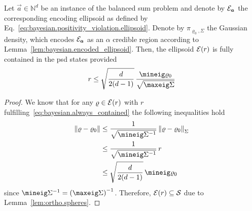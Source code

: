 \begin{lemma}\label{lem:bayesian.always_contained}
  Let $\vec a \in \mathbb{N}^d$ be an instance of the balanced sum problem and denote by $\mathcal{E}_{{\boldsymbol{a}}}$ the corresponding encoding ellipsoid as defined by Eq.~\eqref{eq:bayesian.positivity_violation.ellipsoid}.
  Denote by $\pi_{\varrho_0,\Sigma}$ the Gaussian density, which encodes $\mathcal{E}_{{\boldsymbol{a}}}$ as an $\alpha$ credible region according to Lemma~\ref{lem:bayesian.encoded_ellipsoid}.
  Then, the ellipsoid $\mathcal{E}(r)$ is fully contained in the psd states provided
  \begin{equation}
    \label{eq:bayesian.always_contained}
    r \le \sqrt{\frac{d}{2(d-1)}} \, \frac{\mineig\varrho_0}{\sqrt{\maxeig\Sigma}}
  \end{equation}
\end{lemma}
\begin{proof}
  We know that for any $\varrho \in \mathcal{E}(r)$ with $r$ fulfilling~\eqref{eq:bayesian.always_contained} the following inequalities hold
  \begin{align*}
    \norm{\varrho - \varrho_0}
    &\le \frac{1}{\sqrt{\mineig\Sigma^{-1}}}\, \norm{\varrho - \varrho_0}_\Sigma \\
    &\le \frac{1}{\sqrt{\mineig\Sigma^{-1}}}\, r \\
    &\le \sqrt{\frac{d}{2(d-1)}}\, \mineig \varrho_0
  \end{align*}
  since $\mineig\Sigma^{-1} = {(\maxeig \Sigma)}^{-1}$.
  Therefore, $\mathcal{E}(r) \subseteq \mathcal{S}$ due to Lemma~\ref{lem:ortho.spheres}.
\end{proof}


